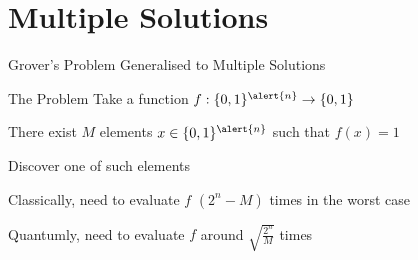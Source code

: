 \documentclass{beamer}
\begin{document}
\section{Multiple Solutions}

\begin{frame}{Grover's Problem Generalised to Multiple Solutions}

        \begin{block}{The Problem}
        Take a function $f : \{0,1\}^{\alert{n}} \to \{0,1\}$

        There exist \alert{$M$} elements $x \in \{0,1\}^{\alert{n}}$ such that $f(x) = 1$ 

        Discover one of such elements  
        \end{block}

        Classically, need to evaluate $f$ $(2^n - M)$ times in the worst case 

        \pause
        Quantumly, need to evaluate $f$ around \alert{$\sqrt{\frac{2^n}{M}}$} times
\end{frame}
\end{document}
